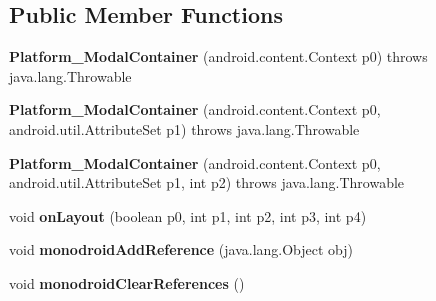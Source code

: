 \subsection*{Public Member Functions}
\begin{DoxyCompactItemize}
\item 
\mbox{\label{classmd5270abb39e60627f0f200893b490a1ade_1_1Platform__ModalContainer_a92a10110c5163250038b70eac72edf9c}} 
{\bfseries Platform\+\_\+\+Modal\+Container} (android.\+content.\+Context p0)  throws java.\+lang.\+Throwable 	
\item 
\mbox{\label{classmd5270abb39e60627f0f200893b490a1ade_1_1Platform__ModalContainer_a7902058e4fdbac267c6743c1b4d61fa1}} 
{\bfseries Platform\+\_\+\+Modal\+Container} (android.\+content.\+Context p0, android.\+util.\+Attribute\+Set p1)  throws java.\+lang.\+Throwable 	
\item 
\mbox{\label{classmd5270abb39e60627f0f200893b490a1ade_1_1Platform__ModalContainer_a65fa53ddac943e43d486ad88b1f799f5}} 
{\bfseries Platform\+\_\+\+Modal\+Container} (android.\+content.\+Context p0, android.\+util.\+Attribute\+Set p1, int p2)  throws java.\+lang.\+Throwable 	
\item 
\mbox{\label{classmd5270abb39e60627f0f200893b490a1ade_1_1Platform__ModalContainer_a20efd00b191e1b55e8d67cfe214aa46e}} 
void {\bfseries on\+Layout} (boolean p0, int p1, int p2, int p3, int p4)
\item 
\mbox{\label{classmd5270abb39e60627f0f200893b490a1ade_1_1Platform__ModalContainer_ad613a79affc6cde31a12e95b9b2f051a}} 
void {\bfseries monodroid\+Add\+Reference} (java.\+lang.\+Object obj)
\item 
\mbox{\label{classmd5270abb39e60627f0f200893b490a1ade_1_1Platform__ModalContainer_a552d05eeda2de9e27a1186fb70663ddd}} 
void {\bfseries monodroid\+Clear\+References} ()
\end{DoxyCompactItemize}
